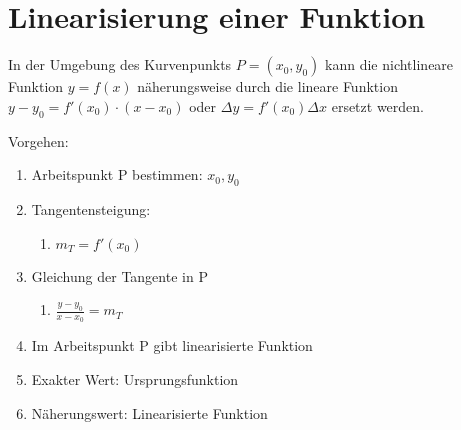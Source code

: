 \section{Linearisierung einer Funktion}
In der Umgebung des Kurvenpunkts \(P=(x_0,y_0)\) kann die nichtlineare Funktion \(y=f(x)\) näherungsweise durch die lineare Funktion\newline
\(y - y_0 = f'(x_0) \cdot (x - x_0) \) oder \( \Delta y = f'(x_0)\Delta x \)\newline
ersetzt werden.

\par Vorgehen: 
\begin{enumerate}
	\item Arbeitspunkt P bestimmen: \(x_0, y_0\)
	\item Tangentensteigung:
	\begin{enumerate}
		\item \(m_T = f'(x_0)\)
	\end{enumerate}
	\item Gleichung der Tangente in P
	\begin{enumerate}
		\item \(\frac{y-y_0}{x-x_0} = m_T\)
	\end{enumerate}
	\item Im Arbeitspunkt P gibt linearisierte Funktion
	\item Exakter Wert: Ursprungsfunktion
	\item Näherungswert: Linearisierte Funktion
\end{enumerate}

%

